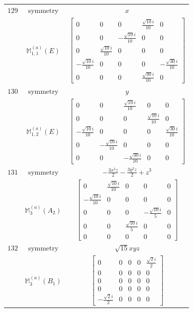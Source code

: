 \documentclass[fleqn,8pt,landscape]{jsarticle}
\begin{document}
\begin{longtable}{ccc}
$ 129 $ & $ \text{symmetry} $ & $ x $ \\
$  $ & $ \mathbb{M}_{1,1}^{(a)}(E) $ & $ \begin{bmatrix} 0 & 0 & 0 & \frac{\sqrt{10} i}{10} & 0 \\ 0 & 0 & - \frac{\sqrt{10} i}{10} & 0 & 0 \\ 0 & \frac{\sqrt{10} i}{10} & 0 & 0 & 0 \\ - \frac{\sqrt{10} i}{10} & 0 & 0 & 0 & - \frac{\sqrt{30} i}{10} \\ 0 & 0 & 0 & \frac{\sqrt{30} i}{10} & 0 \end{bmatrix} $ \\ \hline
$ 130 $ & $ \text{symmetry} $ & $ y $ \\
$  $ & $ \mathbb{M}_{1,2}^{(a)}(E) $ & $ \begin{bmatrix} 0 & 0 & \frac{\sqrt{10} i}{10} & 0 & 0 \\ 0 & 0 & 0 & \frac{\sqrt{10} i}{10} & 0 \\ - \frac{\sqrt{10} i}{10} & 0 & 0 & 0 & \frac{\sqrt{30} i}{10} \\ 0 & - \frac{\sqrt{10} i}{10} & 0 & 0 & 0 \\ 0 & 0 & - \frac{\sqrt{30} i}{10} & 0 & 0 \end{bmatrix} $ \\ \hline
$ 131 $ & $ \text{symmetry} $ & $ - \frac{3 x^{2} z}{2} - \frac{3 y^{2} z}{2} + z^{3} $ \\
$  $ & $ \mathbb{M}_{3}^{(a)}(A_{2}) $ & $ \begin{bmatrix} 0 & \frac{\sqrt{10} i}{10} & 0 & 0 & 0 \\ - \frac{\sqrt{10} i}{10} & 0 & 0 & 0 & 0 \\ 0 & 0 & 0 & - \frac{\sqrt{10} i}{5} & 0 \\ 0 & 0 & \frac{\sqrt{10} i}{5} & 0 & 0 \\ 0 & 0 & 0 & 0 & 0 \end{bmatrix} $ \\ \hline
$ 132 $ & $ \text{symmetry} $ & $ \sqrt{15} x y z $ \\
$  $ & $ \mathbb{M}_{3}^{(a)}(B_{1}) $ & $ \begin{bmatrix} 0 & 0 & 0 & 0 & \frac{\sqrt{2} i}{2} \\ 0 & 0 & 0 & 0 & 0 \\ 0 & 0 & 0 & 0 & 0 \\ 0 & 0 & 0 & 0 & 0 \\ - \frac{\sqrt{2} i}{2} & 0 & 0 & 0 & 0 \end{bmatrix} $ \\ \hline

\end{longtable}
\end{document}
